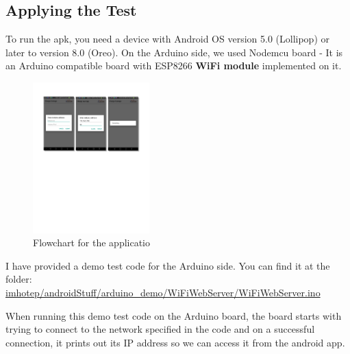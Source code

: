 \subsection{Applying the Test}
     To run the apk, you need a device with Android OS version 5.0 (Lollipop) or later to version 8.0 (Oreo). On the Arduino side, we used Nodemcu board - It is an Arduino compatible board with ESP8266 \textbf{WiFi module} implemented on it.
\begin{figure}[H]
    \centering
    \includegraphics[width=0.4\textwidth,page=6]{figures/androidFigs}
    \caption{Flowchart for the applicatio}
    \label{fig:Flowchart}
\end{figure}
I have provided a demo test code for the Arduino side. You can find it at the folder:\\
\url{imhotep/androidStuff/arduino_demo/WiFiWebServer/WiFiWebServer.ino}

When running this demo test code on the Arduino board, the board starts with trying to connect to the network specified in the code and on a successful connection, it prints out its IP address so we can access it from the android app.